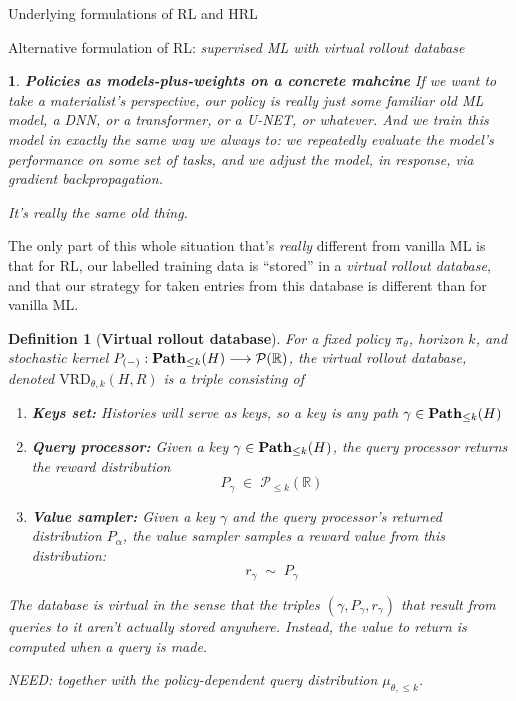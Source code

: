 \documentclass[11pt]{article}
\newtheorem{definition}[subsubsection]{Definition}
\newtheorem{ermark}[subsubsection]{}
\begin{document}
\begin{section}{Underlying formulations of RL and HRL}
\begin{subsection}{Alternative formulation of RL: {\em supervised ML with virtual rollout database}}
\begin{ermark}
{\bf Policies as models-plus-weights on a concrete mahcine}
\normalfont
If we want to take a materialist's perspective, our policy is {\em really} just some familiar old ML model, a DNN, or a transformer, or a U-NET, or whatever.  And we train this model in exactly the same way we always to: we repeatedly evaluate the model’s performance on some set of tasks, and we adjust the model, in response, via gradient backpropagation.

It’s really the same old thing. 
\end{ermark}

The only part of this whole situation that’s {\em really} different from vanilla ML is that for RL, our labelled training data is ``stored'' in a {\em virtual rollout database}, and that our strategy for taken entries from this database is different than for vanilla ML.

\begin{definition}[{\bf Virtual rollout database}]
\normalfont
For a fixed policy \(\pi_\theta\), horizon \(k\), and stochastic kernel $P_{(-)}:\bold{Path}_{\le k}(H)\longrightarrow\mathcal{P}(\mathbb{R})$, the {\em virtual rollout database}, denoted $\text{VRD}_{\theta,k}(H,R)$ is a triple  consisting of
\begin{enumerate}
\item {\bf Keys set:} Histories will serve as {\em keys}, so a key is any path $\gamma\in\bold{Path}_{\le k}(H)$
\item {\bf Query processor:} Given a key $\gamma\in\bold{Path}_{\le k}(H)$, the {\em query processor} returns the reward distribution
$$
P_{\gamma}\;\in\;\mathcal{P}_{\le k}(\mathbb{R})
$$
\item {\bf Value sampler:} Given a key $\gamma$ and the query processor's returned distribution $P_{\alpha}$, the {\em value sampler} samples a reward value from this distribution:
$$
r_{\gamma}\;\sim\;P_{\gamma}
$$
\end{enumerate}
The database is {\em virtual} in the sense that the triples $(\gamma,P_{\gamma},r_\gamma)$ that result from queries to it aren't actually stored anywhere. Instead, the value to return is computed when a query is made. 

NEED: together with the policy-dependent query distribution \(\mu_{\theta,\le k}\). 
\end{definition}

\end{subsection}


\end{section}
\end{document}
